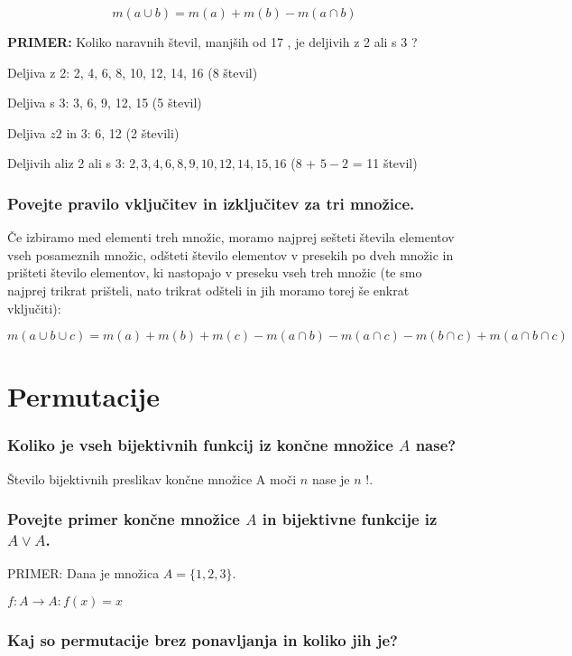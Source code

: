 \documentclass{article}
\begin{document}
$$
m(a \cup b)=m(a)+m(b)-m(a \cap b)
$$

\textbf{PRIMER:}
Koliko naravnih števil, manjših od 17 , je deljivih z 2 ali s 3 ?

Deljiva z 2: 2, 4, 6, 8, 10, 12, 14, 16 (8 števil)

Deljiva s 3: 3, 6, 9, 12, 15 (5 števil)

Deljiva $z 2$ in 3: 6, 12 (2 števili)

Deljivih aliz 2 ali s 3: $2,3,4,6,8,9,10,12,14,15,16$ (8 + $5-2$ = 11 števil)

\subsubsection*{Povejte pravilo vključitev in izključitev za tri množice.}

Če izbiramo med elementi treh množic, moramo najprej sešteti števila elementov vseh posameznih množic, odšteti število elementov v presekih po dveh množic in prišteti število elementov, ki nastopajo v preseku vseh treh množic (te smo najprej trikrat prišteli, nato trikrat odšteli in jih moramo torej še enkrat vključiti):

$$
m(a \cup b \cup c)=m(a)+m(b)+m(c)-m(a \cap b)-m(a \cap c)-m(b \cap c)+m(a \cap b \cap c)
$$

\section{Permutacije}
\subsubsection*{Koliko je vseh bijektivnih funkcij iz končne množice $A$ nase?}

Število bijektivnih preslikav končne množice A moči $n$ nase je $n$ !.

\subsubsection*{Povejte primer končne množice $A$ in bijektivne funkcije iz $A \vee A$.}

PRIMER: Dana je množica $A=\{1,2,3\}$.

$f: A \rightarrow A: f(x)=x$

\subsubsection*{Kaj so permutacije brez ponavljanja in koliko jih je?}
\end{document}
